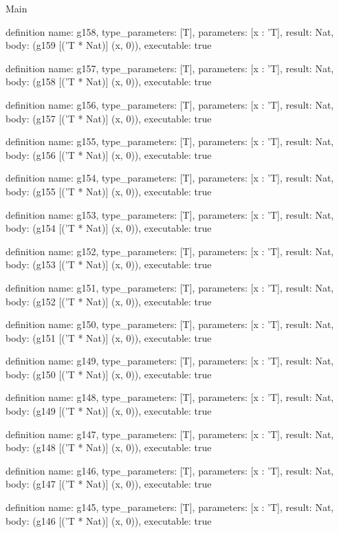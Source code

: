 \begin{lexlean}{Main}
\begin{semanticmodule}
definition{
  name: g158,
  type_parameters: [T],
  parameters: [x : 'T],
  result: Nat,
  body: (g159 [('T * Nat)] (x, 0)),
  executable: true
}

definition{
  name: g157,
  type_parameters: [T],
  parameters: [x : 'T],
  result: Nat,
  body: (g158 [('T * Nat)] (x, 0)),
  executable: true
}

definition{
  name: g156,
  type_parameters: [T],
  parameters: [x : 'T],
  result: Nat,
  body: (g157 [('T * Nat)] (x, 0)),
  executable: true
}

definition{
  name: g155,
  type_parameters: [T],
  parameters: [x : 'T],
  result: Nat,
  body: (g156 [('T * Nat)] (x, 0)),
  executable: true
}

definition{
  name: g154,
  type_parameters: [T],
  parameters: [x : 'T],
  result: Nat,
  body: (g155 [('T * Nat)] (x, 0)),
  executable: true
}

definition{
  name: g153,
  type_parameters: [T],
  parameters: [x : 'T],
  result: Nat,
  body: (g154 [('T * Nat)] (x, 0)),
  executable: true
}

definition{
  name: g152,
  type_parameters: [T],
  parameters: [x : 'T],
  result: Nat,
  body: (g153 [('T * Nat)] (x, 0)),
  executable: true
}

definition{
  name: g151,
  type_parameters: [T],
  parameters: [x : 'T],
  result: Nat,
  body: (g152 [('T * Nat)] (x, 0)),
  executable: true
}

definition{
  name: g150,
  type_parameters: [T],
  parameters: [x : 'T],
  result: Nat,
  body: (g151 [('T * Nat)] (x, 0)),
  executable: true
}

definition{
  name: g149,
  type_parameters: [T],
  parameters: [x : 'T],
  result: Nat,
  body: (g150 [('T * Nat)] (x, 0)),
  executable: true
}

definition{
  name: g148,
  type_parameters: [T],
  parameters: [x : 'T],
  result: Nat,
  body: (g149 [('T * Nat)] (x, 0)),
  executable: true
}

definition{
  name: g147,
  type_parameters: [T],
  parameters: [x : 'T],
  result: Nat,
  body: (g148 [('T * Nat)] (x, 0)),
  executable: true
}

definition{
  name: g146,
  type_parameters: [T],
  parameters: [x : 'T],
  result: Nat,
  body: (g147 [('T * Nat)] (x, 0)),
  executable: true
}

definition{
  name: g145,
  type_parameters: [T],
  parameters: [x : 'T],
  result: Nat,
  body: (g146 [('T * Nat)] (x, 0)),
  executable: true
}


\end{semanticmodule}
\end{lexlean}
